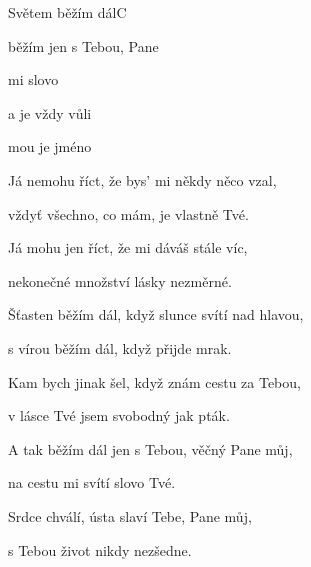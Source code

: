 \setcounter{page}{117}
\begin{song}{Světem běžím dál}{C}{}

\begin{SBVerse}

 běžím  jen s Tebou,  Pane  

 mi  slovo 

 a  je vždy  vůli 

 mou je  jméno 

\end{SBVerse}

\begin{SBChorus}

Já nemohu říct, že bys' mi někdy něco vzal,

vždyť všechno, co mám, je vlastně Tvé.

Já mohu jen říct, že mi dáváš stále víc,

nekonečné množství lásky nezměrné.

\end{SBChorus}

\begin{SBVerse}

Šťasten běžím dál, když slunce svítí nad hlavou,

s vírou běžím dál, když přijde mrak.

Kam bych jinak šel, když znám cestu za Tebou,

v lásce Tvé jsem svobodný jak pták.

\end{SBVerse}

\begin{SBVerse}

A tak běžím dál jen s Tebou, věčný Pane můj,

na cestu mi svítí slovo Tvé.

Srdce chválí, ústa slaví Tebe, Pane můj,

s Tebou život nikdy nezšedne.

\end{SBVerse}

\end{song}
